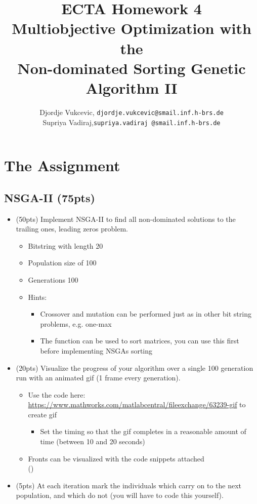 \documentclass{article}
\title{ECTA Homework 4\\Multiobjective Optimization with the\\Non-dominated Sorting Genetic Algorithm II}
\author{\color{red} Djordje Vukcevic, \texttt{djordje.vukcevic@smail.inf.h-brs.de}\\
	\color{red}	Supriya Vadiraj,\texttt{supriya.vadiraj @smail.inf.h-brs.de}}
\begin{document}
\maketitle

\section{The Assignment}

\subsection{NSGA-II (75pts)}
\begin{itemize}
	\item (50pts) Implement NSGA-II to find all non-dominated solutions to the trailing ones, leading zeros problem. 
	\begin{itemize}
		\item Bitstring with length 20
		\item Population size of 100
		\item Generations 100
		\item Hints:
		\begin{itemize}
			\item Crossover and mutation can be performed just as in other bit string problems, e.g. one-max
			\item The  function can be used to sort matrices, you can use this first before implementing NSGAs sorting
		\end{itemize}
	\end{itemize}
	\item (20pts) Visualize the progress of your algorithm over a single 100 generation run with an animated gif (1 frame every generation).
	\begin{itemize}
		\item Use the code here: \url{https://www.mathworks.com/matlabcentral/fileexchange/63239-gif} to create gif
		\begin{itemize}
			\item Set the timing so that the gif completes in a reasonable amount of time (between 10 and 20 seconds)
		\end{itemize}
		\item Fronts can be visualized with the code snippets attached\\ ()
	\end{itemize}
	\item (5pts) At each iteration mark the individuals which carry on to the next population, and which do not (you will have to code this yourself).
\end{itemize}
\end{document}
